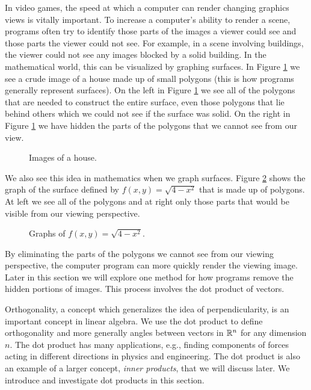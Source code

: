  In video games, the speed at which a computer can render changing graphics views is vitally important. To increase a computer's ability to render a scene, programs often try to identify those parts of the images a viewer could see and those parts the viewer could not see. For example, in a scene involving buildings, the viewer could not see any images blocked by a solid building. In the mathematical world, this can be visualized by graphing surfaces. In  Figure \ref{F:House} we see a crude image of a house made up of small polygons (this is how programs generally represent surfaces). On the left in Figure \ref{F:House} we see all of the polygons that are needed to construct the entire surface, even those polygons that lie behind others which we could not see if the surface was solid. On the right in Figure \ref{F:House} we have hidden the parts of the polygons that we cannot see from our view. 
 \begin{figure}[ht] 
\begin{center}
\caption{Images of a house.}
\label{F:House}
\end{center}
\end{figure}
We also see this idea in mathematics when we graph surfaces. Figure \ref{F:Surface} shows the graph of the surface defined by $f(x,y) = \sqrt{4-x^2}$ that is made up of polygons. At left we see all of the polygons and at right only those parts that would be visible from our viewing perspective. 
\begin{figure}[h]
\begin{center}
 \hspace{0.1in} 
\end{center}
\caption{Graphs of $f(x,y) = \sqrt{4-x^2}$.}
\label{F:Surface}
\end{figure}
By eliminating the parts of the polygons we cannot see from our viewing perspective, the computer program can more quickly render the viewing image. Later in this section we will explore one method for how programs remove the hidden portions of images. This process involves the dot product of vectors.  

\label{sec:dot_prod_intro}

Orthogonality, a concept which generalizes the idea of perpendicularity, is an important concept in linear algebra. We use the dot product to define orthogonality and more generally angles between vectors in $\mathbb{R}^n$ for any dimension $n$. The dot product has many applications, e.g., finding components of forces acting in different directions in physics and engineering. The dot product is also an example of a larger concept, \emph{inner products}, that we will discuss later. We introduce and investigate dot products in this section.

